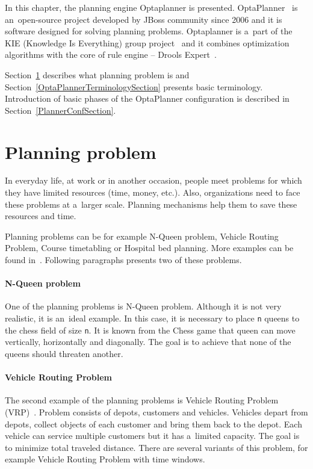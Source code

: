 In this chapter, the planning engine Optaplanner is presented. OptaPlanner~\cite{OptaPlannerPages, DroolsBook} is
an~open-source project developed by JBoss community since 2006 and it is software designed for solving planning
problems. Optaplanner is a~part of the KIE (Knowledge Is Everything) group project~\cite{Kie, Drools} and it combines
optimization algorithms with the core of rule engine -- Drools Expert~\cite{Drools}.

Section~\ref{PlanningProblemSection} describes what planning problem is and Section~\ref{OptaPlannerTerminologySection}
presents basic terminology. Introduction of basic phases of the OptaPlanner configuration is described in
Section~\ref{PlannerConfSection}.

\section{Planning problem}\label{PlanningProblemSection}
In everyday life, at work or in another occasion, people meet problems for which they have limited resources (time,
money, etc.). Also, organizations need to face these problems at a~larger scale. Planning mechanisms help them to save
these resources and time.

Planning problems can be for example N-Queen problem, Vehicle Routing Problem, Course timetabling or Hospital bed
planning. More examples can be found in~\cite{OptaPlannerDoc}. Following paragraphs presents two of these problems.

\paragraph{N-Queen problem}
One of the planning problems is N-Queen problem. Although it is not very realistic, it is an~ideal example. In this
case, it is necessary to place \texttt{n} queens to the chess field of size \texttt{n}. It is known from the Chess game
that queen can move vertically, horizontally and diagonally. The goal is to achieve that none of the queens should
threaten another.

\paragraph{Vehicle Routing Problem}
The second example of the planning problems is Vehicle Routing Problem (VRP)~\cite{VehicleRouting}. Problem consists of
depots, customers and vehicles. Vehicles depart from depots, collect objects of each customer and bring them back to
the depot. Each vehicle can service multiple customers but it has a~limited capacity. The goal is to minimize total
traveled distance. There are several variants of this problem, for example Vehicle Routing Problem with time windows.

